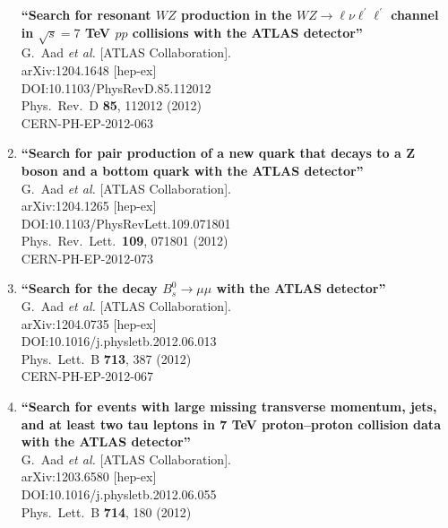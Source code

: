 \documentclass{article}
\begin{document}
\begin{enumerate}
{\bf ``Search for resonant $WZ$ production in the $WZ \to \ell \nu \ell^\prime\ell^\prime$ channel in $\sqrt{s}=7$ TeV $pp$ collisions with the ATLAS detector''}
  \\{}G.~Aad {\it et al.} [ATLAS Collaboration].
  \\{}arXiv:1204.1648 [hep-ex]
  \\{}DOI:10.1103/PhysRevD.85.112012
  \\{}Phys.\ Rev.\ D {\bf 85}, 112012 (2012)
  \\{}CERN-PH-EP-2012-063
\item%
{\bf ``Search for pair production of a new quark that decays to a Z boson and a bottom quark with the ATLAS detector''}
  \\{}G.~Aad {\it et al.} [ATLAS Collaboration].
  \\{}arXiv:1204.1265 [hep-ex]
  \\{}DOI:10.1103/PhysRevLett.109.071801
  \\{}Phys.\ Rev.\ Lett.\  {\bf 109}, 071801 (2012)
  \\{}CERN-PH-EP-2012-073
\item%
{\bf ``Search for the decay $B_s^0 \to \mu \mu$ with the ATLAS detector''}
  \\{}G.~Aad {\it et al.} [ATLAS Collaboration].
  \\{}arXiv:1204.0735 [hep-ex]
  \\{}DOI:10.1016/j.physletb.2012.06.013
  \\{}Phys.\ Lett.\ B {\bf 713}, 387 (2012)
  \\{}CERN-PH-EP-2012-067
\item%
{\bf ``Search for events with large missing transverse momentum, jets, and at least two tau leptons in 7 TeV proton–proton collision data with the ATLAS detector''}
  \\{}G.~Aad {\it et al.} [ATLAS Collaboration].
  \\{}arXiv:1203.6580 [hep-ex]
  \\{}DOI:10.1016/j.physletb.2012.06.055
  \\{}Phys.\ Lett.\ B {\bf 714}, 180 (2012)

\end{enumerate}
\end{document}
